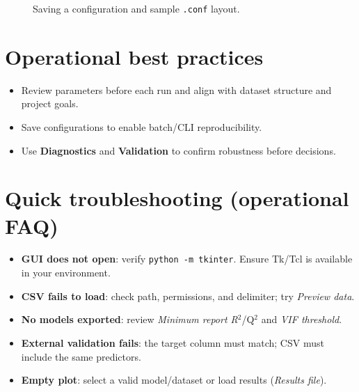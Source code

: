 \documentclass[12pt,a4paper]{article}
\begin{document}
\begin{figure}[H]
  \centering
  \fbox{\rule[0pt]{0pt}{110pt}\hspace{0.9\linewidth}}
  \caption{Saving a configuration and sample \texttt{.conf} layout.}
  \label{fig:conf}
\end{figure}

\section{Operational best practices}
\begin{itemize}
  \item Review parameters before each run and align with dataset structure and project goals.
  \item Save configurations to enable batch/CLI reproducibility.
  \item Use \textbf{Diagnostics} and \textbf{Validation} to confirm robustness before decisions.
\end{itemize}

\section{Quick troubleshooting (operational FAQ)}
\begin{itemize}
  \item \textbf{GUI does not open}: verify \texttt{python -m tkinter}. Ensure Tk/Tcl is available in your environment.
  \item \textbf{CSV fails to load}: check path, permissions, and delimiter; try \emph{Preview data}.
  \item \textbf{No models exported}: review \emph{Minimum report R$^2$}/Q$^2$ and \emph{VIF threshold}.
  \item \textbf{External validation fails}: the target column must match; CSV must include the same predictors.
  \item \textbf{Empty plot}: select a valid model/dataset or load results (\emph{Results file}).
\end{itemize}

\end{document}
